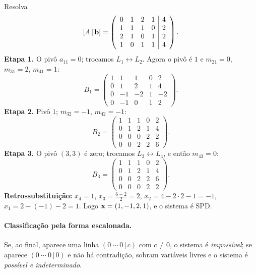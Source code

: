 \begin{exemplo}
Resolva
\[
[A\,|\,\mathbf{b}]=\left(\begin{array}{rrrr|r}
0 & 1 & 2 & 1 & 4\\
1 & 1 & 1 & 0 & 2\\
2 & 1 & 0 & 1 & 2\\
1 & 0 & 1 & 1 & 4
\end{array}\right).
\]
\textbf{Etapa 1.} O pivô $a_{11}=0$; trocamos $L_1\leftrightarrow L_2$. Agora o pivô é $1$ e
$m_{21}=0$, $m_{31}=2$, $m_{41}=1$:
\[
B_1=\left(\begin{array}{rrrr|r}
1 & 1 & 1 & 0 & 2\\
0 & 1 & 2 & 1 & 4\\
0 & -1 & -2 & 1 & -2\\
0 & -1 & 0 & 1 & 2
\end{array}\right).
\]
\textbf{Etapa 2.} Pivô $1$; $m_{32}=-1$, $m_{42}=-1$:
\[
B_2=\left(\begin{array}{rrrr|r}
1 & 1 & 1 & 0 & 2\\
0 & 1 & 2 & 1 & 4\\
0 & 0 & 0 & 2 & 2\\
0 & 0 & 2 & 2 & 6
\end{array}\right).
\]
\textbf{Etapa 3.} O pivô $(3,3)$ é zero; trocamos $L_3\leftrightarrow L_4$, e então $m_{43}=0$:
\[
B_3=\left(\begin{array}{rrrr|r}
1 & 1 & 1 & 0 & 2\\
0 & 1 & 2 & 1 & 4\\
0 & 0 & 2 & 2 & 6\\
0 & 0 & 0 & 2 & 2
\end{array}\right).
\]
\textbf{Retrossubstituição:} $x_4=1$, $x_3=\frac{6-2}{2}=2$, $x_2=4-2\cdot2-1=-1$,
$x_1=2-(-1)-2=1$. Logo $\mathbf{x}=(1,-1,2,1)$, e o sistema é SPD.
\end{exemplo}

\paragraph{Classificação pela forma escalonada.} Se, ao final, aparece uma linha
$(0\ \cdots\ 0\,|\,c)$ com $c\neq0$, o sistema é \emph{impossível}; se aparece
$(0\ \cdots\ 0\,|\,0)$ e não há contradição, sobram variáveis livres e o sistema é
\emph{possível e indeterminado}.

